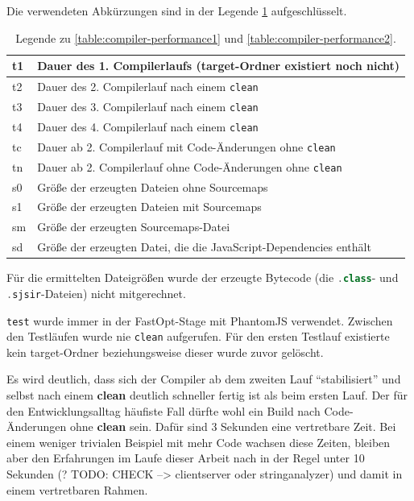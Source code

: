 \documentclass[a4paper, 12pt, hidelinks, listof=totoc, listoftables=totoc, bibliography=totoc]{scrreprt}
\newcommand{\code}[1]{\lstinline[language=Scala, style=inline]|#1|}
\begin{document}
\medskip

Die verwendeten Abkürzungen sind in der Legende \ref{table:compiler-performance-legend} aufgeschlüsselt.

\medskip

\begin{table}[!h]
\begin{tabular}{|l|l|}
\hline t1 & Dauer des 1. Compilerlaufs (target-Ordner existiert noch nicht) \\ 
\hline t2 & Dauer des 2. Compilerlauf nach einem \code{clean} \\ 
\hline t3 & Dauer des 3. Compilerlauf nach einem \code{clean} \\ 
\hline t4 & Dauer des 4. Compilerlauf nach einem \code{clean} \\ 
\hline tc & Dauer ab 2. Compilerlauf mit Code-Änderungen ohne \code{clean} \\ 
\hline tn & Dauer ab 2. Compilerlauf ohne Code-Änderungen ohne \code{clean} \\ 
\hline s0 & Größe der erzeugten Dateien ohne Sourcemaps \\ 
\hline s1 & Größe der erzeugten Dateien mit Sourcemaps \\ 
\hline sm & Größe der erzeugten Sourcemaps-Datei \\ 
\hline sd & Größe der erzeugten Datei, die die JavaScript-Dependencies enthält \\ 
\hline 
\end{tabular} 
\caption{Legende zu \ref{table:compiler-performance1} und \ref{table:compiler-performance2}.}
\label{table:compiler-performance-legend}
\end{table}

\medskip

Für die ermittelten Dateigrößen wurde der erzeugte Bytecode (die \code{.class}- und \code{.sjsir}-Dateien) nicht mitgerechnet.

\code{test} wurde immer in der FastOpt-Stage mit PhantomJS verwendet. Zwischen den Testläufen wurde nie \code{clean} aufgerufen. Für den ersten Testlauf existierte kein target-Ordner beziehungsweise dieser wurde zuvor gelöscht.

Es wird deutlich, dass sich der Compiler ab dem zweiten Lauf "`stabilisiert"' und selbst nach einem \textbf{clean} deutlich schneller fertig ist als beim ersten Lauf. Der für den Entwicklungsalltag häufiste Fall dürfte wohl ein Build nach Code-Änderungen ohne \textbf{clean} sein. Dafür sind 3 Sekunden eine vertretbare Zeit. Bei einem weniger trivialen Beispiel mit mehr Code wachsen diese Zeiten, bleiben aber den Erfahrungen im Laufe dieser Arbeit nach in der Regel unter 10 Sekunden (? TODO: CHECK --> clientserver oder stringanalyzer) und damit in einem vertretbaren Rahmen.
\end{document}
